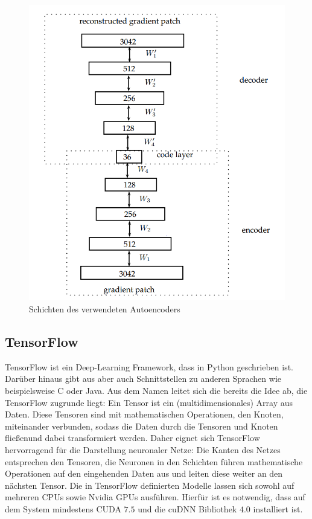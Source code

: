 \begin{figure}
	\centering
	\includegraphics[scale=0.6]{images/ae_model.png}
	\caption{Schichten des verwendeten Autoencoders \cite{aed2016}}
	\label{img:ae_model}
\end{figure}

\subsection{TensorFlow}

TensorFlow ist ein Deep-Learning Framework, dass in Python geschrieben ist. Darüber hinaus gibt aus aber auch Schnittstellen zu anderen Sprachen wie beispielsweise C oder Java. Aus dem Namen leitet sich die bereits die Idee ab, die TensorFlow zugrunde liegt: Ein Tensor ist ein (multidimensionales) Array aus Daten. Diese Tensoren sind mit mathematischen Operationen, den Knoten, miteinander verbunden, sodass die Daten durch die Tensoren und Knoten \grqq fließen\grqq und dabei transformiert werden. Daher eignet sich TensorFlow hervorragend für die Darstellung neuronaler Netze: Die Kanten des Netzes entsprechen den Tensoren, die Neuronen in den Schichten führen mathematische Operationen auf den eingehenden Daten aus und leiten diese weiter an den nächsten Tensor. Die in TensorFlow definierten Modelle lassen sich sowohl auf mehreren CPUs sowie Nvidia GPUs ausführen. Hierfür ist es notwendig, dass auf dem System mindestens CUDA $7.5$ und die cuDNN Bibliothek $4.0$ installiert ist. 
